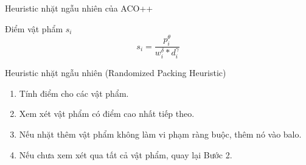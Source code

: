 \documentclass[aspectratio=169]{beamer}
\begin{document}
\begin{frame}{Heuristic nhặt ngẫu nhiên của ACO++}
     {
    \begin{block}{Điểm vật phẩm $s_i$}
        $$s_i = \frac{p_i^\theta}{w_i^\delta * d_i^\gamma}$$
    \end{block}
    }
     {
    \begin{block}{Heuristic nhặt ngẫu nhiên (Randomized Packing Heuristic)}
        \begin{enumerate}
            \justifying
            \vspace{0.1cm}
            \item Tính điểm cho các vật phẩm.
            \vspace{0.1cm}
            \item Xem xét vật phẩm có điểm cao nhất tiếp theo.
            \vspace{0.1cm}
            \item Nếu nhặt thêm vật phẩm không làm vi phạm ràng buộc, thêm nó vào balo.
            \vspace{0.1cm}
            \item Nếu chưa xem xét qua tất cả vật phẩm, quay lại Bước 2.
            \vspace{0.1cm}
        \end{enumerate}
    \end{block}
    }
\end{frame}
\end{document}
